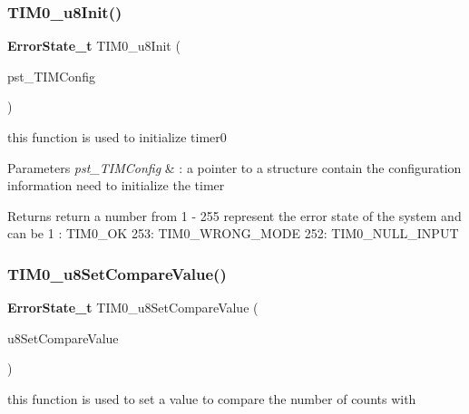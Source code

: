\subsubsection{T\+I\+M0\+\_\+u8\+Init()}
{\footnotesize\ttfamily \textbf{ Error\+State\+\_\+t} T\+I\+M0\+\_\+u8\+Init (\begin{DoxyParamCaption}\item[{\textbf{ T\+I\+M0\+\_\+\+Config\+\_\+t} $\ast$}]{pst\+\_\+\+T\+I\+M\+Config }\end{DoxyParamCaption})}



this function is used to initialize timer0 


\begin{DoxyParams}{Parameters}
{\em pst\+\_\+\+T\+I\+M\+Config} & \+: a pointer to a structure contain the configuration information need to initialize the timer \\
\hline
\end{DoxyParams}
\begin{DoxyReturn}{Returns}
return a number from 1 -\/ 255 represent the error state of the system and can be 1 \+: T\+I\+M0\+\_\+\+OK 253\+: T\+I\+M0\+\_\+\+W\+R\+O\+N\+G\+\_\+\+M\+O\+DE 252\+: T\+I\+M0\+\_\+\+N\+U\+L\+L\+\_\+\+I\+N\+P\+UT 
\end{DoxyReturn}
\mbox{\label{_t_i_m_e_r0__interface_8h_a689d58acea491f346ef7ea249f7c98e0}} 
\subsubsection{T\+I\+M0\+\_\+u8\+Set\+Compare\+Value()}
{\footnotesize\ttfamily \textbf{ Error\+State\+\_\+t} T\+I\+M0\+\_\+u8\+Set\+Compare\+Value (\begin{DoxyParamCaption}\item[{\textbf{ uint8\+\_\+t}}]{u8\+Set\+Compare\+Value }\end{DoxyParamCaption})}



this function is used to set a value to compare the number of counts with 


